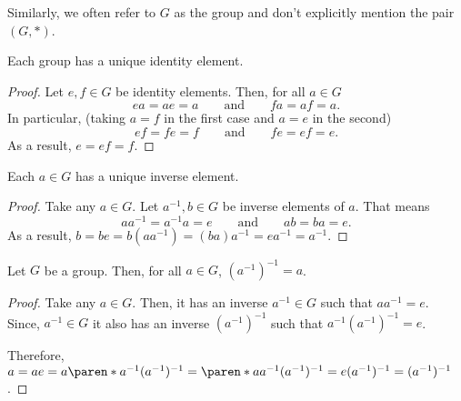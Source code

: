 \documentclass[11pt]{penrose}
\begin{document}
Similarly, we often refer to $G$ as the group and don't explicitly mention the pair $(G, *)$.

\begin{nthm}
    Each group has a unique identity element.
\end{nthm}
\begin{proof}
    Let $e, f \in G$ be identity elements. Then, for all $a \in G$
    \begin{equation*}
        ea = ae = a
        \qquad\text{and}\qquad
        fa = af = a.
    \end{equation*}
    In particular, (taking $a=f$ in the first case and $a=e$ in the second)
    \begin{equation*}
        ef = fe = f
        \qquad\text{and}\qquad
        fe = ef = e.
    \end{equation*}
    As a result, $e = ef = f$.
\end{proof}

\begin{nthm}
    Each $a \in G$ has a unique inverse element.
\end{nthm}
\begin{proof}
    Take any $a \in G$. Let $a^{-1}, b \in G$ be inverse elements of $a$. That means
    \begin{equation*}
        a a^{-1} = a^{-1} a = e
        \qquad\text{and}\qquad
        a b = b a = e.
    \end{equation*}
    As a result, $b = b e = b(a a^{-1}) = (b a) a^{-1} = e a^{-1} = a^{-1}$.
\end{proof}

\begin{nthm}
    Let $G$ be a group. Then, for all $a \in G$, $(a^{-1})^{-1} = a$.
\end{nthm}
\begin{proof}
    Take any $a \in G$. Then, it has an inverse $a^{-1} \in G$ such that $a a^{-1} = e$. Since, $a^{-1} \in G$ it also has an inverse $(a^{-1})^{-1}$ such that $a^{-1} (a^{-1})^{-1} = e$.

    Therefore,
    $a = a e = a \paren*{a^{-1} (a^{-1})^{-1}} = \paren*{a a^{-1}} (a^{-1})^{-1} = e (a^{-1})^{-1} = (a^{-1})^{-1}$.
\end{proof}
\end{document}
